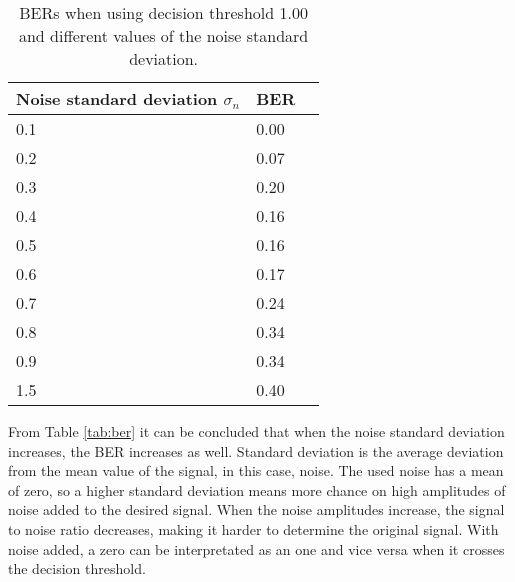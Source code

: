 \documentclass[final]{scrreprt} %
\begin{document}
\begin{table}[H]
\begin{center}
\begin{tabular}{ | l | l | l | }
    \hline
    Noise standard deviation $\sigma_n$ & BER \\\hline
    0.1 & 0.00 \\\hline
    0.2 & 0.07 \\\hline
    0.3 & 0.20 \\\hline
    0.4 & 0.16 \\\hline
    0.5 & 0.16 \\\hline
    0.6 & 0.17 \\\hline
    0.7 & 0.24 \\\hline
    0.8 & 0.34 \\\hline
    0.9 & 0.34 \\\hline
    1.5 & 0.40 \\\hline
\end{tabular}
\caption{BERs when using decision threshold 1.00 and different values of the noise standard deviation.}
\end{center}
\end{table}
\label{tab:ber}

From Table \ref{tab:ber} it can be concluded that when the noise standard deviation increases, the BER increases as well. Standard deviation is the average deviation from the mean value of the signal, in this case, noise. The used noise has a mean of zero, so a higher standard deviation means more chance on high amplitudes of noise added to the desired signal. When the noise amplitudes increase, the signal to noise ratio decreases, making it harder to determine the original signal. With noise added, a zero can be interpretated as an one and vice versa when it crosses the decision threshold.
\end{document}

